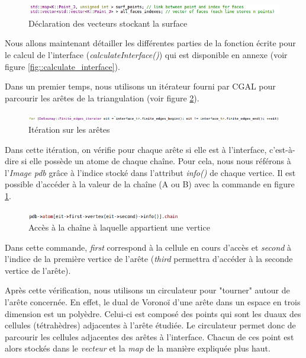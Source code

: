 \begin{figure}[ht]
\centering
  \includegraphics[width=\textwidth]{figures/init_surf_vect.png}
  \caption{Déclaration des vecteurs stockant la surface}
  \label{fig::init_surf_vector}
\end{figure}

Nous allons maintenant détailler les différentes parties de la fonction écrite pour
le calcul de l'interface (\textit{calculateInterface()}) qui est disponible en
annexe (voir figure \ref{fig::calculate_interface}).

Dans un premier temps, nous utilisons un itérateur fourni par CGAL pour parcourir
les arêtes de la triangulation (voir figure \ref{fig::iter_edges}).
\begin{figure}[ht]
\centering
  \includegraphics[width=\textwidth]{figures/iter_edges.png}
  \caption{Itération sur les arêtes}
  \label{fig::iter_edges}
\end{figure}
Dans cette itération, on vérifie pour chaque arête si elle est à l'interface, c'est-à-dire
si elle possède un atome de chaque chaîne. Pour cela, nous nous référons à l'\textit{Image pdb}
grâce à l'indice stocké dans l'attribut \textit{info()} de chaque vertice. Il est possible
d'accéder à la valeur de la chaîne (A ou B) avec la commande en figure \ref{fig::init_surf_vector}.
\begin{figure}[ht]
\centering
  \includegraphics[width=0.6\textwidth]{figures/access_chain.png}
  \caption{Accès à la chaîne à laquelle appartient une vertice}
  \label{fig::access_chain}
\end{figure}
Dans cette commande, \textit{first} correspond à la cellule en cours d'accès et
\textit{second} à l'indice de la première vertice de l'arête (\textit{third} permettra
d'accéder à la seconde vertice de l'arête).

Après cette vérification, nous utilisons un circulateur pour "tourner" autour de l'arête
concernée. En effet, le dual de Voronoï d'une arête dans un espace en trois dimension
est un polyèdre. Celui-ci est composé des points qui sont les duaux des cellules (tétrahèdres)
adjacentes à l'arête étudiée. Le circulateur permet donc de parcourir les cellules adjacentes
des arêtes à l'interface. Chacun de ces point est alors stockés dans le \textit{vecteur} et
la \textit{map} de la manière expliquée plus haut.

